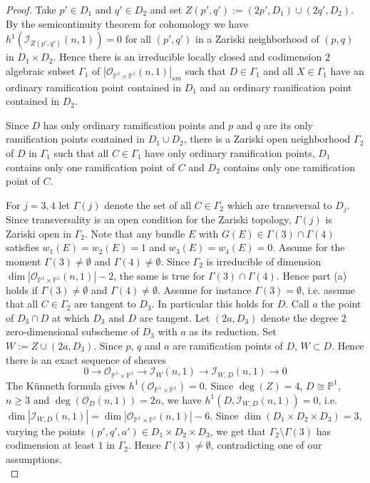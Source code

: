 \documentclass[
  a4paper, 
  reqno, 
  oneside, 
  11pt
]{amsart}
\theoremstyle{plain}	%
\theoremstyle{mydef} %
\theoremstyle{remark}
\theoremstyle{definition}
\theoremstyle{remark}
\begin{document}
\begin{proof}
Take $p'\in D_1$ and $q'\in D_2$ and set
$Z(p',q'):= (2p',D_1)\cup (2q',D_2)$. By the semicontinuity theorem for cohomology  \cite[Th. III.13.8]{h} we have  $h^1(\mathcal I_{Z(p',q')}(n,1))=0$
for all $(p',q')$ in a Zariski neighborhood of $(p,q)$ in $D_1\times D_2$. Hence there is an irreducible locally closed and codimension $2$ algebraic subset $\Gamma_1$ of $|\mathcal O_{\mathbb P^1\times \mathbb P^1}(n,1)|_{sm}$ such that $D\in \Gamma_1$ and
all $X\in \Gamma_1 $  have an ordinary ramification point contained in $D_1$ and an ordinary ramification point contained in $D_2$. 

Since $D$ has only ordinary ramification points and $p$ and $q$ are its only ramification points contained in $D_1\cup D_2$, there is a Zariski open neighborhood $\Gamma_2$ of $D$ in $\Gamma_1$ such that all $C\in \Gamma_1$ have only ordinary ramification points, $D_1$ contains only one ramification point of $C$ and $D_2$
contains only one ramification point of $C$.

For $j=3,4$ let $\Gamma(j)$ denote the set of all $C\in \Gamma_2$ which are transversal to $D_j$. Since transversality is an open condition for the Zariski topology, $\Gamma(j)$ is Zariski open in $\Gamma_2$. Note that any bundle $E$ with $G(E)\in \Gamma(3)\cap \Gamma(4)$ satisfies $w_1(E)=w_2(E)=1$ and $w_3(E)=w_4(E)=0$. Assume for the moment $\Gamma(3)\ne \emptyset$ and $\Gamma(4)\ne \emptyset$. Since $\Gamma_2$ is irreducible of dimension $\dim |\mathcal O_{\mathbb P^1\times \mathbb P^1}(n,1)|-2$, the same is true for $\Gamma(3)\cap \Gamma(4)$. Hence part (a) holds if $\Gamma(3)\ne \emptyset$ and $\Gamma(4)\ne \emptyset$.
Assume for instance $\Gamma(3)=\emptyset$, i.e. assume that all $C\in \Gamma_2$ are tangent to $D_3$. In particular this holds for $D$. Call $a$ the point of $D_3\cap D$ at which $D_3$ and $D$ are tangent. Let $(2a,D_3)$ denote the degree $2$ zero-dimensional subscheme of $D_3$ with $a$ as its reduction. Set $W:= Z\cup (2a,D_3)$. Since $p$, $q$ and $a$ are ramification points of $D$, $W\subset D$. Hence there is an exact sequence of sheaves
\begin{equation}\label{eqb2}
0\to \mathcal O_{\mathbb P^1\times \mathbb P^1}\to \mathcal I_W(n,1)\to \mathcal I_{W,D}(n,1)\to 0
\end{equation}
 The K\"{u}nneth formula gives $h^1(\mathcal O_{\mathbb P^1\times \mathbb P^1})=0$. Since $\deg(Z)=4$, $D\cong \mathbb P^1$, $n\ge 3$ and $\deg(\mathcal O_D(n,1)) =2n$, we have
$h^1(D,\mathcal I_{W,D}(n,1)) =0$, i.e. $\dim |\mathcal I_{W,D}(n,1)| =\dim |\mathcal O_{\mathbb P^1\times \mathbb P^1}(n,1)|-6$. Since $\dim (D_1\times D_2\times D_3)=3$, varying the points $(p',q',a')
\in D_1\times D_2\times D_3$, we get that $\Gamma_2\setminus \Gamma(3)$ has codimension at least $1$ in $\Gamma_2$.
Hence $\Gamma(3)\ne \emptyset$, contradicting one of our assumptions. \\


\end{proof}
\end{document}
